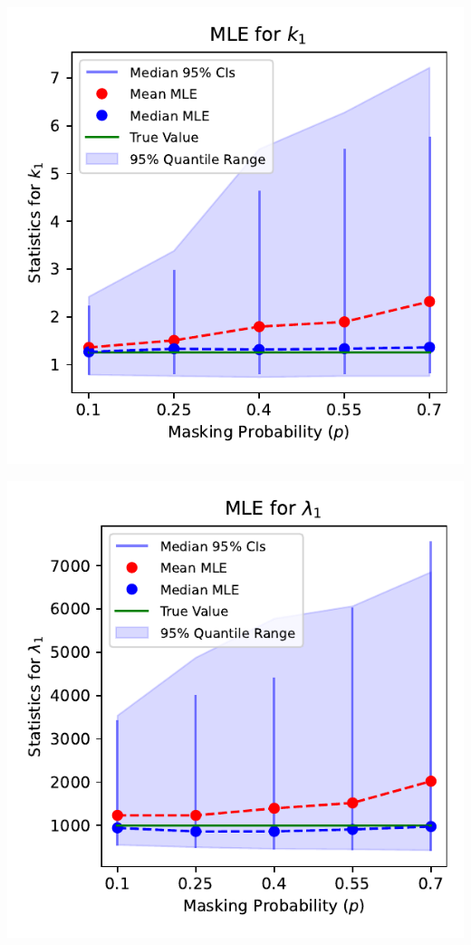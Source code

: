 \documentclass{article}
\begin{document}
\pagestyle{empty}

\noindent
\begin{minipage}[t]{0.475\textwidth}
  \centering
  \includegraphics[width=\textwidth,height=0.33\textheight,keepaspectratio]{plot-p-vs-shape.1.pdf}
\end{minipage}%
\begin{minipage}[t]{0.475\textwidth}
  \centering
  \includegraphics[width=\textwidth,height=0.33\textheight,keepaspectratio]{plot-p-vs-scale.1.pdf}
\end{minipage}
\end{document}
